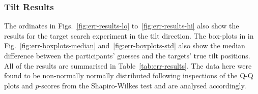 \documentclass[sigconf, review=true, screen=true, anonymous=true]{acmart}
\begin{document}


\subsubsection{Tilt Results}
\label{sec:tilt-results}

The ordinates in Figs.~\ref{fig:err-results-lo} to~\ref{fig:err-results-hi} also show the results for the target search experiment in the tilt direction.
The box-plots in in Fig.~\ref{fig:err-boxplots-median} and~\ref{fig:err-boxplots-std} also show the median difference between the participants' guesses and the targets' true tilt positions. 
All of the results are summarised in Table~\ref{tab:err-results}. 
The data here were found to be non-normally normally distributed following inspections of the Q-Q plots and $p$-scores from the Shapiro-Wilkes test and are analysed accordingly.
\end{document}
